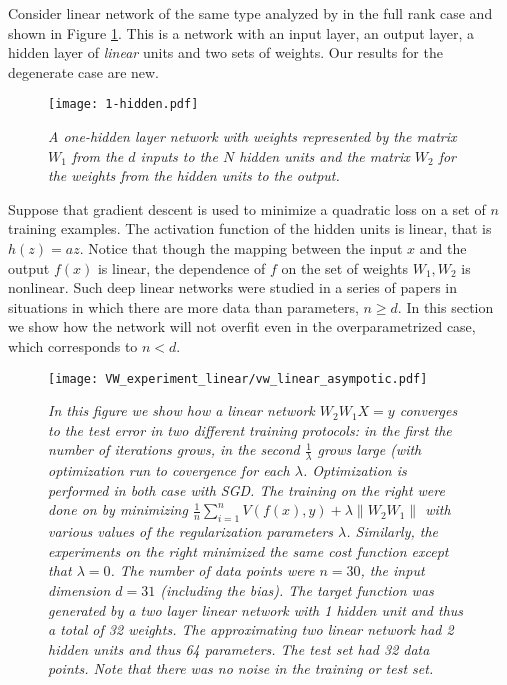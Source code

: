 \documentclass[10pt]{article}
\begin{document}
Consider  linear
network of the same type analyzed by \cite{Baldi:89,
  DBLP:journals/corr/SaxeMG13} in the full rank case and shown in
Figure \ref{1-hidden}. This is a network with an input layer, an
output layer, a hidden layer of {\it linear} units and two sets of
weights. Our results  for the degenerate case are new.



\begin{figure*}[h!]\centering
  \texttt{[image: 1-hidden.pdf]}
\caption{\it A one-hidden layer network with weights represented by
  the matrix $W_1$ from the $d$ inputs to the $N$ hidden units and the
  matrix $W_2$ for the weights from the hidden units to the output.}
\label{1-hidden}
\end{figure*}


Suppose that gradient descent is used to minimize a quadratic loss on
a set of $n$ training examples. The activation function of the hidden
units is linear, that is $h(z)=az$. Notice that though the mapping
between the input $x$ and the output $f(x)$ is linear, the dependence
of $f$ on the set of weights $W_1, W_2$ is nonlinear. Such deep linear
networks were studied in a series of papers\cite{Baldi:89,
  DBLP:journals/corr/SaxeMG13, kawaguchi2016deep} in situations in
which there are more data than parameters, $n \ge d$. In this section
we show how the network will not overfit even in the
overparametrized case, which corresponds to $n < d$.




\begin{figure*}[h!]\centering
\texttt{[image: VW\_experiment\_linear/vw\_linear\_asympotic.pdf]}
\caption{\it In this figure we show how a linear network
  $W_2 W_1 X = y $ converges to the test error in two different
  training protocols: in the first the number of iterations
  grows, in the second  $\frac{1}{\lambda}$ grows large (with
  optimization run to covergence for each $\lambda$.  Optimization is
  performed in both case with  SGD. The training on the right
  were done on by minimizing 
  $\frac{1}{n} \sum^{n}_{i=1} V(f(x),y) + \lambda \| W_2 W_1 \| $
  with various values of the regularization parameters
  $\lambda$. Similarly, the experiments on the right minimized the
  same cost function except that $\lambda = 0$.  The number of data
  points were $n=30$, the input dimension $d=31$ (including the
  bias).  The target function was generated by a two layer linear network with 1
  hidden unit and thus a total of 32 weights. The approximating two linear network 
  had 2 hidden units and thus 64 parameters.  The test set had 32 data
  points. Note that there was no noise in the training or test set.}
\label{1-hiddenLin}
\end{figure*}
\end{document}
